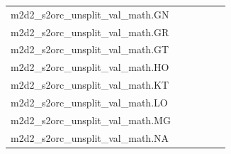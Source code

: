 \documentclass[dvipsnames]{article}
\begin{document}
\begin{appendix}
{\begin{longtable}{m{6cm}m{1.7cm}m{1.7cm}m{1.7cm}m{1.7cm}m{1.7cm}}
	m2d2\_s2orc\_unsplit\_val\_math.GN  & \colorbox[HTML]{77c578}{\makebox[\mywidth][c]{6.27}} & \colorbox[HTML]{eaf7af}{\makebox[\mywidth][c]{6.56}} & \colorbox[HTML]{ffffe5}{\makebox[\mywidth][c]{7.82}} & \colorbox[HTML]{d1ec9f}{\makebox[\mywidth][c]{6.45}} & \colorbox[HTML]{b7e193}{\makebox[\mywidth][c]{6.38}}\\
	m2d2\_s2orc\_unsplit\_val\_math.GR  & \colorbox[HTML]{77c578}{\makebox[\mywidth][c]{7.39}} & \colorbox[HTML]{e5f5ac}{\makebox[\mywidth][c]{7.66}} & \colorbox[HTML]{ffffe5}{\makebox[\mywidth][c]{9.00}} & \colorbox[HTML]{b8e293}{\makebox[\mywidth][c]{7.51}} & \colorbox[HTML]{84cb7d}{\makebox[\mywidth][c]{7.41}}\\
	m2d2\_s2orc\_unsplit\_val\_math.GT  & \colorbox[HTML]{77c578}{\makebox[\mywidth][c]{7.47}} & \colorbox[HTML]{d9f0a3}{\makebox[\mywidth][c]{7.71}} & \colorbox[HTML]{ffffe5}{\makebox[\mywidth][c]{9.27}} & \colorbox[HTML]{bde395}{\makebox[\mywidth][c]{7.62}} & \colorbox[HTML]{78c679}{\makebox[\mywidth][c]{7.47}}\\
	m2d2\_s2orc\_unsplit\_val\_math.HO  & \colorbox[HTML]{c6e89a}{\makebox[\mywidth][c]{14.52}} & \colorbox[HTML]{e6f5ad}{\makebox[\mywidth][c]{14.70}} & \colorbox[HTML]{ffffe5}{\makebox[\mywidth][c]{16.52}} & \colorbox[HTML]{c2e698}{\makebox[\mywidth][c]{14.51}} & \colorbox[HTML]{77c578}{\makebox[\mywidth][c]{14.31}}\\
	m2d2\_s2orc\_unsplit\_val\_math.KT  & \colorbox[HTML]{77c578}{\makebox[\mywidth][c]{7.54}} & \colorbox[HTML]{e3f4aa}{\makebox[\mywidth][c]{7.80}} & \colorbox[HTML]{ffffe5}{\makebox[\mywidth][c]{9.14}} & \colorbox[HTML]{c8e89a}{\makebox[\mywidth][c]{7.70}} & \colorbox[HTML]{90d082}{\makebox[\mywidth][c]{7.58}}\\
	m2d2\_s2orc\_unsplit\_val\_math.LO  & \colorbox[HTML]{77c578}{\makebox[\mywidth][c]{9.84}} & \colorbox[HTML]{f1f9b4}{\makebox[\mywidth][c]{10.41}} & \colorbox[HTML]{ffffe5}{\makebox[\mywidth][c]{12.53}} & \colorbox[HTML]{cdeb9d}{\makebox[\mywidth][c]{10.13}} & \colorbox[HTML]{b7e193}{\makebox[\mywidth][c]{10.03}}\\
	m2d2\_s2orc\_unsplit\_val\_math.MG  & \colorbox[HTML]{77c578}{\makebox[\mywidth][c]{8.25}} & \colorbox[HTML]{e2f3a9}{\makebox[\mywidth][c]{8.53}} & \colorbox[HTML]{ffffe5}{\makebox[\mywidth][c]{9.99}} & \colorbox[HTML]{c5e799}{\makebox[\mywidth][c]{8.42}} & \colorbox[HTML]{7cc77a}{\makebox[\mywidth][c]{8.26}}\\
	m2d2\_s2orc\_unsplit\_val\_math.NA  & \colorbox[HTML]{86cc7e}{\makebox[\mywidth][c]{9.85}} & \colorbox[HTML]{d5eea1}{\makebox[\mywidth][c]{10.05}} & \colorbox[HTML]{ffffe5}{\makebox[\mywidth][c]{11.66}} & \colorbox[HTML]{b4e091}{\makebox[\mywidth][c]{9.95}} & \colorbox[HTML]{77c578}{\makebox[\mywidth][c]{9.83}}\\

\end{longtable}}
\end{appendix}
\end{document}
